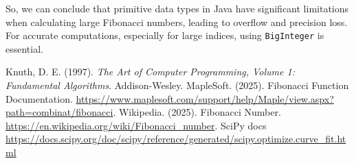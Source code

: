 \documentclass{article}
\begin{document}
So, we can conclude that primitive data types in Java have significant limitations when calculating large Fibonacci numbers, leading to overflow and precision loss.
For accurate computations, especially for large indices, using \texttt{BigInteger} is essential.


\begin{thebibliography}{9}
Knuth, D. E. (1997). \textit{The Art of Computer Programming, Volume 1: Fundamental Algorithms}. Addison-Wesley.
MapleSoft. (2025). Fibonacci Function Documentation. \url{https://www.maplesoft.com/support/help/Maple/view.aspx?path=combinat/fibonacci}.
Wikipedia. (2025). Fibonacci Number. \url{https://en.wikipedia.org/wiki/Fibonacci_number}.
SciPy docs \url{https://docs.scipy.org/doc/scipy/reference/generated/scipy.optimize.curve_fit.html}
\end{thebibliography}
\end{document}
